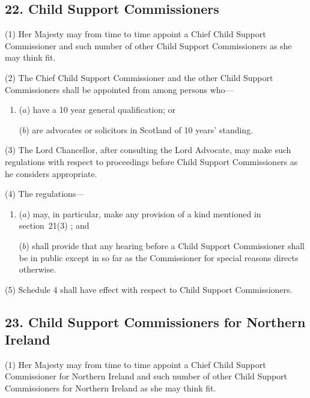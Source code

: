 \documentclass[12pt,a4paper]{article}
\begin{document}
\subsection{22. Child Support Commissioners}

(1) Her Majesty may from time to time appoint a Chief Child Support Commissioner and such number of other Child Support Commissioners as she may think fit.

(2) The Chief Child Support Commissioner and the other Child Support Commissioners shall be appointed from among persons who—
\begin{enumerate}\item[]
($a$) have a 10 year general qualification; or

($b$) are advocates or solicitors in Scotland of 10 years' standing.
\end{enumerate}

(3) The Lord Chancellor, after consulting the Lord Advocate, may make such regulations with respect to proceedings before Child Support Commissioners as he considers appropriate.

(4) The regulations—
\begin{enumerate}\item[]
($a$) may, in particular, make any provision of a kind mentioned in 
section~21(3)%
; and

($b$) shall provide that any hearing before a Child Support Commissioner shall be in public except in so far as the Commissioner for special reasons directs otherwise.
\end{enumerate}

(5) Schedule 4 shall have effect with respect to Child Support Commissioners.


\subsection{23. Child Support Commissioners for Northern Ireland}

(1) Her Majesty may from time to time appoint a Chief Child Support Commissioner for Northern Ireland and such number of other Child Support Commissioners for Northern Ireland as she may think fit.
\end{document}
